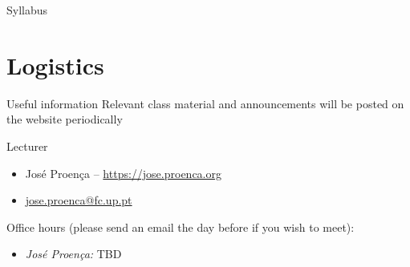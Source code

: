 \documentclass[aspectratio=169]{beamer}
\begin{document}
\begin{slide}{Syllabus}
\end{slide}


\section{Logistics}

\begin{frame}{Useful information}
  Relevant class material and announcements will be posted on the website periodically

  {\centering{}

  }

  \alert{Lecturer}
    \begin{itemize}
      \item José Proença -- \url{https://jose.proenca.org}
      \item \href{mailto:jose.proenca@fc.up.pt}{jose.proenca@fc.up.pt}
    \end{itemize}
           

  \alert{Office hours} (please send an email the day before if you wish to meet):
  \begin{itemize}
    \item \emph{José Proença:} TBD %
  \end{itemize} 
\end{frame}
\end{document}
